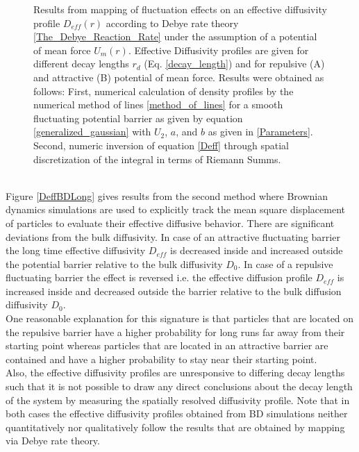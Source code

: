 \begin{minipage}[t]{.37 \textwidth}
    \begin{figure}[H]
        \caption{Results from mapping of fluctuation effects on an effective diffusivity profile $D_{eff}(r)$ according to Debye rate theory \ref{The_Debye_Reaction_Rate} under the assumption of a potential of mean force $U_m(r)$. Effective Diffusivity profiles are given for different decay lengths $r_d$ (Eq. \eqref{decay_length}) and for repulsive (A) and attractive (B) potential of mean force. Results were obtained as follows: First, numerical calculation of density profiles by the numerical method of lines \ref{method_of_lines} for a smooth fluctuating potential barrier as given by equation \eqref{generalized_gaussian} with $U_2$, $a$, and $b$ as given in \eqref{Parameters}. Second, numeric inversion of equation \eqref{Deff} through spatial discretization of the integral in terms of Riemann Summs.   \label{DeffMOL}}
    \end{figure}
  \end{minipage}
\vspace{0.3 cm}\\
Figure \ref{DeffBDLong} gives results from the second method where Brownian dynamics simulations are used to explicitly track the mean square displacement of particles to evaluate their effective diffusive behavior.
There are significant deviations from the bulk diffusivity. In case of an attractive fluctuating barrier the long time effective diffusivity $D_{eff}$ is decreased inside and increased outside the potential barrier relative to the  bulk diffusivity $D_0$. In case of a repulsive fluctuating barrier the effect is reversed i.e. the effective diffusion profile $D_{eff}$ is increased inside and decreased outside the barrier relative to the bulk diffusion diffusivity $D_0$. \\
One reasonable explanation for this signature is that particles that are located on the repulsive barrier have a higher probability for long runs far away from their starting point whereas particles that are located in an attractive barrier are contained and have a higher probability to stay near their starting point.\\ 
Also, the effective diffusivity profiles are unresponsive to differing decay lengths such that it is not possible to draw any direct conclusions about the decay length of the system by measuring the spatially resolved diffusivity profile.
Note that in both cases the effective diffusivity profiles obtained from BD simulations neither quantitatively nor qualitatively follow the results that are obtained by mapping via Debye rate theory.
